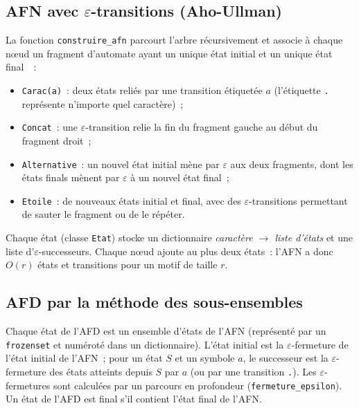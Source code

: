 \documentclass[11pt,a4paper]{article}
\begin{document}
\subsection{\texorpdfstring{AFN avec $\varepsilon$-transitions (Aho-Ullman)}{AFN avec epsilon-transitions (Aho-Ullman)}}

La fonction \texttt{construire\_afn} parcourt l'arbre récursivement et
associe à chaque nœud un fragment d'automate ayant un unique état initial et
un unique état final~\cite{Aho2006,Thompson1968}~:
\begin{itemize}
  \item \texttt{Carac(a)}~: deux états reliés par une transition étiquetée $a$
    (l'étiquette \texttt{.} représente n'importe quel caractère)~;
  \item \texttt{Concat}~: une $\varepsilon$-transition relie la fin du
    fragment gauche au début du fragment droit~;
  \item \texttt{Alternative}~: un nouvel état initial mène par $\varepsilon$
    aux deux fragments, dont les états finals mènent par $\varepsilon$ à un
    nouvel état final~;
  \item \texttt{Etoile}~: de nouveaux états initial et final, avec des
    $\varepsilon$-transitions permettant de sauter le fragment ou de le répéter.
\end{itemize}
Chaque état (classe \texttt{Etat}) stocke un dictionnaire
\emph{caractère $\to$ liste d'états} et une liste d'$\varepsilon$-successeurs.
Chaque nœud ajoute au plus deux états~: l'AFN a donc $O(r)$ états et
transitions pour un motif de taille $r$.

\subsection{AFD par la méthode des sous-ensembles}

Chaque état de l'AFD est un ensemble d'états de l'AFN (représenté par un
\texttt{frozenset} et numéroté dans un dictionnaire). L'état initial est la
$\varepsilon$-fermeture de l'état initial de l'AFN~; pour un état $S$ et un
symbole $a$, le successeur est la $\varepsilon$-fermeture des états atteints
depuis $S$ par $a$ (ou par une transition \texttt{.}). Les
$\varepsilon$-fermetures sont calculées par un parcours en profondeur
(\texttt{fermeture\_epsilon}). Un état de l'AFD est final s'il contient
l'état final de l'AFN.
\end{document}
